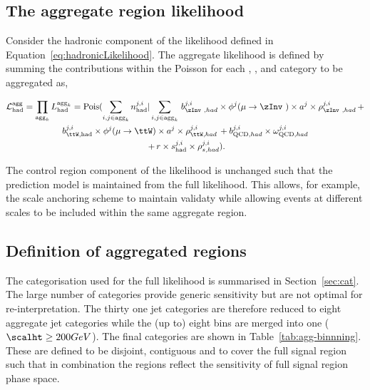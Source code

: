 \subsection{The aggregate region likelihood}

Consider the hadronic component of the likelihood defined in Equation~\ref{eq:hadronicLikelihood}.
The aggregate likelihood is defined by summing the contributions within the Poisson for
each \mht, \scalht, \nb and \njet category to be aggregated as,

\begin{multline}
\label{eq:aggregatedLikelihood}
\mathcal{L}^{\text{agg}}_{\mathrm{had}} = \prod_{\text{agg}_{k}} {L}^{\text{agg}_{k}}_{\mathrm{had}} = \mathrm{Pois}(\sum_{i,j\in\text{agg}_{k}} n^{j,i}_{\mathrm{had}} |\sum_{i,j\in\text{agg}_{k}}\, b^{j,i}_{\zInv~,had}\times\phi^{j}(\mu\rightarrow\zInv~)\times a^{j}\times\rho^{j,i}_{\zInv~,had}\, + \\ 
b^{j,i}_{\ttW,\mathrm{had}}\times\phi^{j}(\mu\rightarrow\ttW)\times a^{j}\times\rho^{j,i}_{\ttW,had}\, + b^{j,i}_{\text{QCD},had}\times\omega^{j,i}_{\text{QCD},had}\\\
+ \,r\times s^{j,i}_{\mathrm{had}}\times\rho^{j,i}_{s,had}).
\end{multline}

The control region component of the likelihood is unchanged such that the prediction model
is maintained from the full likelihood. This allows, for example, the scale anchoring 
scheme to maintain validaty while allowing events at different scales to be included 
within the same aggregate region.

\subsection{Definition of aggregated regions}
\label{sec:ssr-alphat}
The categorisation used for the full likelihood is summarised in Section~\ref{sec:cat}. 
The large number of categories provide generic sensitivity but are not optimal for re-interpretation. 
The thirty one jet categories are therefore reduced to eight aggregate jet categories while
the (up to) eight \scalht bins are merged into one ($\scalht \geq 200 GeV$).
The final categories are shown in Table~\ref{tab:agg-binnning}.
These are defined to be disjoint, contiguous and to cover the full
signal region such that in combination the regions reflect the sensitivity of
full signal region phase space.

